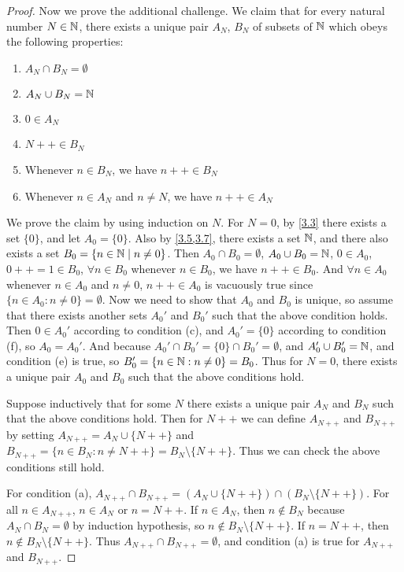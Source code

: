 \begin{proof}
  Now we prove the additional challenge.
  We claim that for every natural number \(N \in \mathbb{N}\), there exists a unique pair \(A_N\), \(B_N\) of subsets of \(\mathbb{N}\) which obeys the following properties:
  \begin{enumerate}
    \item \(A_N \cap B_N = \emptyset\)
    \item \(A_N \cup B_N = \mathbb{N}\)
    \item \(0 \in A_N\)
    \item \(N++ \in B_N\)
    \item Whenever \(n \in B_N\), we have \(n++ \in B_N\)
    \item Whenever \(n \in A_N\) and \(n \neq N\), we have \(n++ \in A_N\)
  \end{enumerate}

  We prove the claim by using induction on \(N\).
  For \(N = 0\), by \cref{3.3} there exists a set \(\{0\}\), and let \(A_0 = \{0\}\).
  Also by \cref{3.5,3.7}, there exists a set \(\mathbb{N}\), and there also exists a set \(B_0 = \{n \in \mathbb{N} \mid n \neq 0\}\).
  Then \(A_0 \cap B_0 = \emptyset\), \(A_0 \cup B_0 = \mathbb{N}\), \(0 \in A_0\), \(0++ = 1 \in B_0\), \(\forall n \in B_0\) whenever \(n \in B_0\), we have \(n++ \in B_0\).
  And \(\forall n \in A_0\) whenever \(n \in A_0\) and \(n \neq 0\), \(n++ \in A_0\) is vacuously true since \(\{n \in A_0 : n \neq 0\} = \emptyset\).
  Now we need to show that \(A_0\) and \(B_0\) is unique, so assume that there exists another sets \(A_0'\) and \(B_0'\) such that the above condition holds.
  Then \(0 \in A_0'\) according to condition (c), and \(A_0' = \{0\}\) according to condition (f), so \(A_0 = A_0'\).
  And because \(A_0' \cap B_0' = \{0\} \cap B_0' = \emptyset\), and \(A_0' \cup B_0' = \mathbb{N}\), and condition (e) is true, so \(B_0' = \{n \in \mathbb{N} : n \neq 0\} = B_0\).
  Thus for \(N = 0\), there exists a unique pair \(A_0\) and \(B_0\) such that the above conditions hold.

  Suppose inductively that for some \(N\) there exists a unique pair \(A_N\) and \(B_N\) such that the above conditions hold.
  Then for \(N++\) we can define \(A_{N++}\) and \(B_{N++}\) by setting \(A_{N++} = A_N \cup \{N++\}\) and \(B_{N++} = \{n \in B_N : n \neq N++\} = B_N \setminus \{N++\}\).
  Thus we can check the above conditions still hold.

  For condition (a), \(A_{N++} \cap B_{N++} = (A_N \cup \{N++\}) \cap (B_N \setminus \{N++\})\).
  For all \(n \in A_{N++}\), \(n \in A_N\) or \(n = N++\).
  If \(n \in A_N\), then \(n \notin B_N\) because \(A_N \cap B_N = \emptyset\) by induction hypothesis, so \(n \notin B_N \setminus \{N++\}\).
  If \(n = N++\), then \(n \notin B_N \setminus \{N++\}\).
  Thus \(A_{N++} \cap B_{N++} = \emptyset\), and condition (a) is true for \(A_{N++}\) and \(B_{N++}\).


\end{proof}
